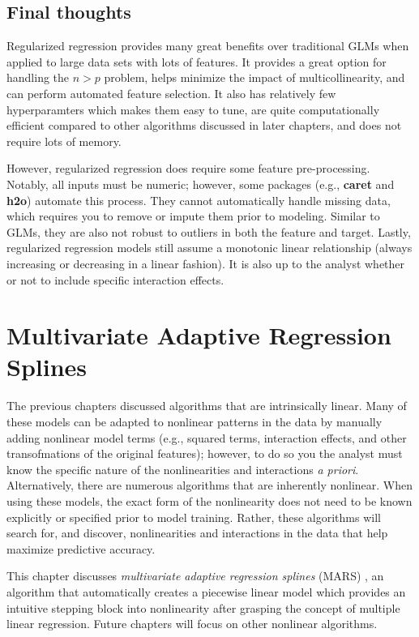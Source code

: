 \documentclass[]{krantz}
\begin{document}
\hypertarget{final-thoughts-2}{%
\section{Final thoughts}\label{final-thoughts-2}}

Regularized regression provides many great benefits over traditional GLMs when applied to large data sets with lots of features. It provides a great option for handling the \(n > p\) problem, helps minimize the impact of multicollinearity, and can perform automated feature selection. It also has relatively few hyperparamters which makes them easy to tune, are quite computationally efficient compared to other algorithms discussed in later chapters, and does not require lots of memory.

However, regularized regression does require some feature pre-processing. Notably, all inputs must be numeric; however, some packages (e.g., \textbf{caret} and \textbf{h2o}) automate this process. They cannot automatically handle missing data, which requires you to remove or impute them prior to modeling. Similar to GLMs, they are also not robust to outliers in both the feature and target. Lastly, regularized regression models still assume a monotonic linear relationship (always increasing or decreasing in a linear fashion). It is also up to the analyst whether or not to include specific interaction effects.

\hypertarget{mars}{%
\chapter{Multivariate Adaptive Regression Splines}\label{mars}}

The previous chapters discussed algorithms that are intrinsically linear. Many of these models can be adapted to nonlinear patterns in the data by manually adding nonlinear model terms (e.g., squared terms, interaction effects, and other transofmations of the original features); however, to do so you the analyst must know the specific nature of the nonlinearities and interactions \emph{a priori}. Alternatively, there are numerous algorithms that are inherently nonlinear. When using these models, the exact form of the nonlinearity does not need to be known explicitly or specified prior to model training. Rather, these algorithms will search for, and discover, nonlinearities and interactions in the data that help maximize predictive accuracy.

This chapter discusses \emph{multivariate adaptive regression splines} (MARS) \citep{friedman1991multivariate}, an algorithm that automatically creates a piecewise linear model which provides an intuitive stepping block into nonlinearity after grasping the concept of multiple linear regression. Future chapters will focus on other nonlinear algorithms.
\end{document}
